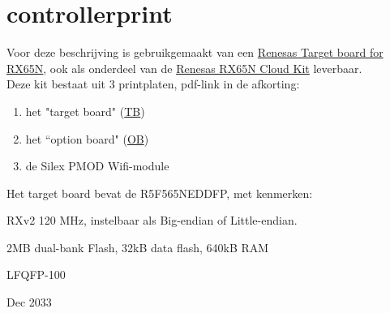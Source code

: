 \documentclass[a4paper, 11pt, fleqn, twoside]{scrartcl}%
\renewenvironment{description}[1][1em]%
 {\list{}{\labelwidth=0pt \leftmargin=#1
  \let\makelabel\descriptionlabel}}
 {\endlist}
\begin{document}
\pagestyle{RvLpagina}

\section{controllerprint}
Voor deze beschrijving is gebruikgemaakt van een 
\href{https://www.renesas.com/eu/en/products/software-tools/boards-and-kits/eval-kits/rx-family-target-board.html}{Renesas Target board for RX65N}, 
ook als onderdeel van de 
\href{https://www.renesas.com/eu/en/products/software-tools/boards-and-kits/eval-kits/rx65n-cloud-kit.html}{Renesas RX65N Cloud Kit}
leverbaar.\\

Deze kit bestaat uit 3 printplaten, pdf-link in de afkorting:
\begin{enumerate}
\item het "target board" 
 (\href{https://www.renesas.com/en-eu/doc/products/mpumcu/doc/rx_family/r12um0038ej0100-cloud.pdf}{TB})
\item het ``option board" 
 (\href{https://www.renesas.com/en-eu/doc/products/mpumcu/doc/rx_family/001/r12um0039eg0100-cloud.pdf}{OB})
\item de Silex PMOD Wifi-module\\
\end{enumerate}

Het target board bevat de R5F565NEDDFP, met kenmerken:
\begin{description}[1.2em]
\item[controller] RXv2 120 MHz, instelbaar als Big-endian of Little-endian.
\item[geheugen] 2MB dual-bank Flash, 32kB data flash, 640kB RAM
\item[behuizing] LFQFP-100
\item[verkoop tot] Dec 2033\\
\end{description}
\end{document}
